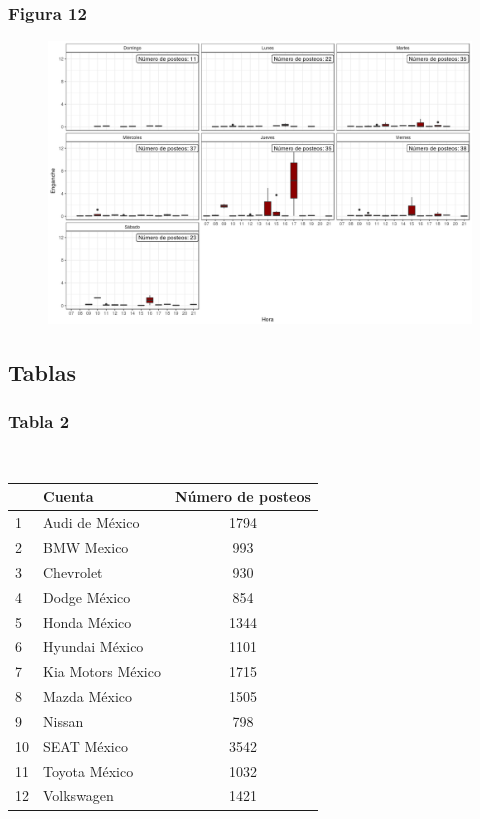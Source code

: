 \documentclass[a4paper,10pt]{article}
\begin{document}
\subsubsection{Figura 12}
\begin{figure}[H]
  \begin{center}
   \includegraphics[width=.85\textwidth]{imagenes/engancheVwfs}
      \captionsetup{width=.80\textwidth}
   \caption{\centering } 
  \end{center} 
\end{figure}


\subsection{Tablas}

\subsubsection{Tabla 2}

\begin{center}
  \\[0.3cm]
  \begin{tabular}{l|l|c}
    \hline 
    & Cuenta & Número de posteos \\
    \hline
    1 & Audi de México & 1794 \\
    2 & BMW Mexico & 993 \\
    3 & Chevrolet & 930 \\
    4 & Dodge México & 854 \\
    5 & Honda México & 1344 \\
    6 & Hyundai México & 1101 \\
    7 & Kia Motors México & 1715 \\
    8 & Mazda México & 1505 \\
    9 & Nissan & 798 \\
    10 & SEAT México & 3542 \\
    11 & Toyota México & 1032 \\
    12 & Volkswagen & 1421 \\
    \hline
  \end{tabular}
\end{center}
\end{document}
